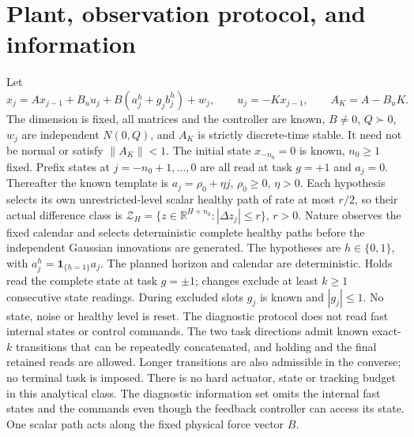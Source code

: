 \documentclass[11pt]{article}
\begin{document}
\section{Plant, observation protocol, and information}
Let
\[
x_j=A x_{j-1}+B_u u_j+B(a_j^h+g_j b_j^h)+w_j,\qquad
u_j=-Kx_{j-1},\qquad A_K=A-B_uK .
\]
The dimension is fixed, all matrices and the controller are known,
$B\ne0$, $Q\succ0$, $w_j$ are independent $N(0,Q)$, and $A_K$ is strictly
discrete-time stable. It need not be normal or satisfy $\|A_K\|<1$.
The initial state $x_{-n_0}=0$ is known, $n_0\ge1$ fixed.
Prefix states at $j=-n_0+1,\ldots,0$ are all read at task $g=+1$ and
$a_j=0$. Thereafter the known template is $a_j=\rho_0+\eta j$,
$\rho_0\ge0$, $\eta>0$. Each hypothesis selects its own unrestricted-level
scalar healthy path of rate at most $r/2$, so their actual difference class
is $\mathcal Z_H=\{z\in\mathbb R^{H+n_0}:|\Delta z_j|\le r\}$, $r>0$.
Nature observes the fixed calendar and selects deterministic complete healthy
paths before the independent Gaussian innovations are generated.
The hypotheses are $h\in\{0,1\}$, with $a_j^h=\mathbf1_{\{h=1\}}a_j$.
The planned horizon and calendar are deterministic. Holds read the complete
state at task $g=\pm1$; changes exclude at least $k\ge1$ consecutive state
readings. During excluded slots $g_j$ is known and $|g_j|\le1$.
No state, noise or healthy level is reset.
The diagnostic protocol does not read fast internal states or control commands.
The two task directions admit known exact-$k$ transitions that can be repeatedly
concatenated, and holding and the final retained reads are allowed.
Longer transitions are also admissible in the converse; no terminal task is imposed.
There is no hard actuator, state or tracking budget in this analytical class.
The diagnostic information set omits the internal fast states and the commands
even though the feedback controller can access its state.
One scalar path acts along the fixed physical force vector $B$.
\end{document}
